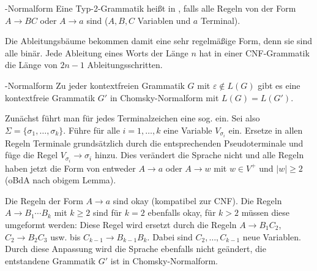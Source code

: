 \linie
\pagebreak

\begin{Def}{-Normalform}
    Eine Typ-2-Grammatik heißt in , falls
    alle Regeln von der Form $A \rightarrow BC$ oder $A \rightarrow a$ sind
    ($A, B, C$ Variablen und $a$ Terminal).
\end{Def}

\begin{Bem}
    Die Ableitungsbäume bekommen damit eine sehr regelmäßige Form, denn sie
    sind alle binär.
    Jede Ableitung eines Worts der Länge $n$ hat in einer CNF-Grammatik
    die Länge von $2n - 1$ Ableitungsschritten.
\end{Bem}

\begin{Satz}{-Normalform}
    Zu jeder kontextfreien Grammatik $G$ mit $\varepsilon \notin L(G)$ gibt
    es eine kontextfreie Grammatik $G'$ in Chomsky-Normalform mit
    $L(G) = L(G')$.
\end{Satz}

\begin{Beweis}
    Zunächst führt man für jedes Terminalzeichen eine sog.
     ein.
    Sei also $\Sigma = \{\sigma_1, \dotsc, \sigma_k\}$.
    Führe für alle $i = 1, \dotsc, k$ eine Variable $V_{\sigma_i}$ ein.
    Ersetze in allen Regeln Terminale grundsätzlich durch die entsprechenden
    Pseudoterminale und füge die Regel $V_{\sigma_i} \rightarrow \sigma_i$
    hinzu.
    Dies verändert die Sprache nicht und alle Regeln haben jetzt die Form
    von entweder $A \rightarrow a$ oder $A \rightarrow w$ mit
    $w \in V^+$ und $|w| \ge 2$
    (oBdA nach obigem Lemma).

    Die Regeln der Form $A \rightarrow a$ sind okay (kompatibel zur CNF).
    Die Regeln $A \rightarrow B_1 \dotsb B_k$ mit $k \ge 2$ sind
    für $k = 2$ ebenfalls okay, für $k > 2$ müssen diese umgeformt werden:
    Diese Regel wird ersetzt durch die Regeln
    $A \rightarrow B_1 C_2$, $C_2 \rightarrow B_2 C_3$ usw. bis
    $C_{k-1} \rightarrow B_{k-1} B_k$.
    Dabei sind $C_2, \dotsc, C_{k-1}$ neue Variablen.
    Durch diese Anpassung wird die Sprache ebenfalls nicht geändert,
    die entstandene Grammatik $G'$ ist in Chomsky-Normalform.
\end{Beweis}

